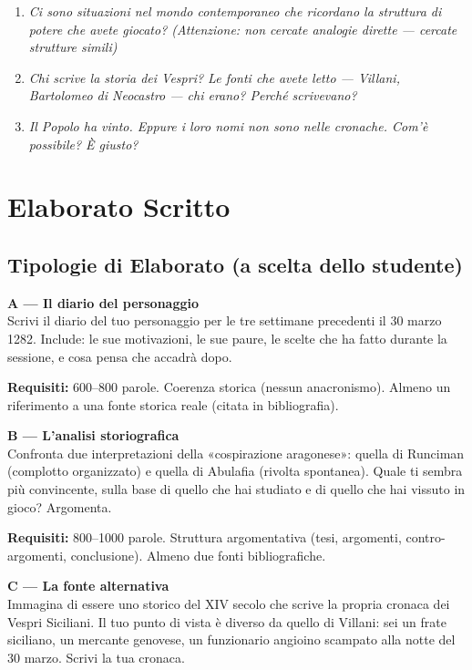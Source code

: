 \begin{enumerate}
  \item \textit{Ci sono situazioni nel mondo contemporaneo
    che ricordano la struttura di potere che avete giocato?
    (Attenzione: non cercate analogie dirette — cercate
    strutture simili)}

  \item \textit{Chi scrive la storia dei Vespri? Le fonti
    che avete letto — Villani, Bartolomeo di Neocastro —
    chi erano? Perché scrivevano?}

  \item \textit{Il Popolo ha vinto. Eppure i loro nomi
    non sono nelle cronache. Com'è possibile? È giusto?}
\end{enumerate}

\secsep

\section{Elaborato Scritto}

\subsection{Tipologie di Elaborato (a scelta dello studente)}

\textbf{A — Il diario del personaggio}\\
Scrivi il diario del tuo personaggio per le tre settimane
precedenti il 30 marzo 1282. Include: le sue motivazioni,
le sue paure, le scelte che ha fatto durante la sessione,
e cosa pensa che accadrà dopo.

\textbf{Requisiti:} 600--800 parole. Coerenza storica (nessun
anacronismo). Almeno un riferimento a una fonte storica
reale (citata in bibliografia).

\filetto

\textbf{B — L'analisi storiografica}\\
Confronta due interpretazioni della «cospirazione aragonese»:
quella di Runciman (complotto organizzato) e quella di Abulafia
(rivolta spontanea). Quale ti sembra più convincente, sulla
base di quello che hai studiato e di quello che hai vissuto
in gioco? Argomenta.

\textbf{Requisiti:} 800--1000 parole. Struttura argomentativa
(tesi, argomenti, contro-argomenti, conclusione). Almeno due
fonti bibliografiche.

\filetto

\textbf{C — La fonte alternativa}\\
Immagina di essere uno storico del XIV secolo che scrive
la propria cronaca dei Vespri Siciliani. Il tuo punto di
vista è diverso da quello di Villani: sei un frate siciliano,
un mercante genovese, un funzionario angioino scampato alla
notte del 30 marzo. Scrivi la tua cronaca.


